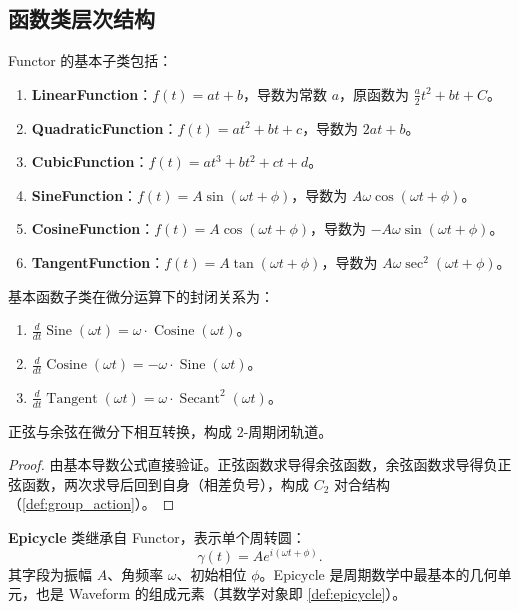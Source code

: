 \subsection{函数类层次结构}

\begin{definition}[基本函数子类]\label{def:basic_function_subclasses}
Functor 的基本子类包括：
\begin{enumerate}[label=(\roman*)]
    \item \textbf{LinearFunction}：$f(t) = at + b$，导数为常数 $a$，原函数为 $\frac{a}{2}t^2 + bt + C$。
    \item \textbf{QuadraticFunction}：$f(t) = at^2 + bt + c$，导数为 $2at + b$。
    \item \textbf{CubicFunction}：$f(t) = at^3 + bt^2 + ct + d$。
    \item \textbf{SineFunction}：$f(t) = A\sin(\omega t + \phi)$，导数为 $A\omega\cos(\omega t + \phi)$。
    \item \textbf{CosineFunction}：$f(t) = A\cos(\omega t + \phi)$，导数为 $-A\omega\sin(\omega t + \phi)$。
    \item \textbf{TangentFunction}：$f(t) = A\tan(\omega t + \phi)$，导数为 $A\omega\sec^2(\omega t + \phi)$。
\end{enumerate}
\end{definition}

\begin{proposition}[基本函数的导数封闭性]\label{prop:basic_function_derivative_closure}
基本函数子类在微分运算下的封闭关系为：
\begin{enumerate}[label=(\roman*)]
    \item $\frac{d}{dt}\operatorname{Sine}(\omega t) = \omega \cdot \operatorname{Cosine}(\omega t)$。
    \item $\frac{d}{dt}\operatorname{Cosine}(\omega t) = -\omega \cdot \operatorname{Sine}(\omega t)$。
    \item $\frac{d}{dt}\operatorname{Tangent}(\omega t) = \omega \cdot \operatorname{Secant}^2(\omega t)$。
\end{enumerate}
正弦与余弦在微分下相互转换，构成 $2$-周期闭轨道。
\end{proposition}

\begin{proof}
由基本导数公式直接验证。正弦函数求导得余弦函数，余弦函数求导得负正弦函数，两次求导后回到自身（相差负号），构成 $C_2$ 对合结构（\cref{def:group_action}）。
\end{proof}

\begin{definition}[Epicycle 类]\label{def:epicycle_class}
\textbf{Epicycle} 类继承自 Functor，表示单个周转圆：
\[
\gamma(t) = A e^{i(\omega t + \phi)}.
\]
其字段为振幅 $A$、角频率 $\omega$、初始相位 $\phi$。Epicycle 是周期数学中最基本的几何单元，也是 Waveform 的组成元素（其数学对象即 \cref{def:epicycle}）。
\end{definition}


